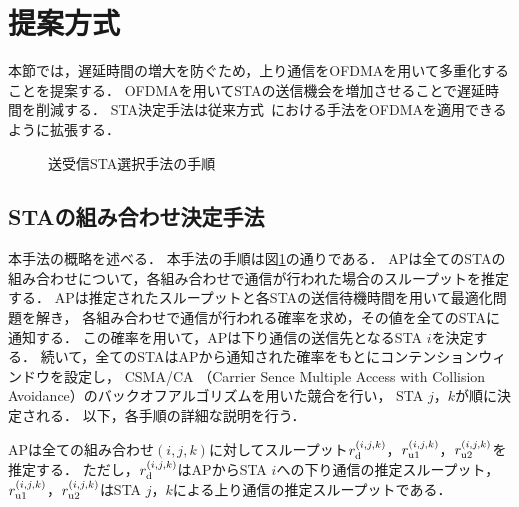 \documentclass[technicalreport]{ieicej}
\newcommand{\sij}{(i,j)}
\newcommand{\sijk}{(i,j,k)}
\newcommand{\rijk}{r^{(i,j,k)}}
\def\coloneqq{\mathrel{\mathop:}=}
\begin{document}
\section{提案方式}\label{sec:propose}
	本節では，遅延時間の増大を防ぐため，上り通信をOFDMAを用いて多重化することを提案する．
	OFDMAを用いてSTAの送信機会を増加させることで遅延時間を削減する．
	STA決定手法は従来方式~\cite{promac_fair}における手法をOFDMAを適用できるように拡張する．

	\begin{figure}[t]
		\centering
		\caption{送受信STA選択手法の手順}
		\label{fig:process}
	\end{figure}

	\subsection{STAの組み合わせ決定手法}\label{sec:opt}
		本手法の概略を述べる．
		本手法の手順は図\ref{fig:process}の通りである．
		APは全てのSTAの組み合わせについて，各組み合わせで通信が行われた場合のスループットを推定する．
		APは推定されたスループットと各STAの送信待機時間を用いて最適化問題を解き，
		各組み合わせで通信が行われる確率を求め，その値を全てのSTAに通知する．
		この確率を用いて，APは下り通信の送信先となるSTA $i$を決定する．
		続いて，全てのSTAはAPから通知された確率をもとにコンテンションウィンドウを設定し，
		CSMA/CA （Carrier Sence Multiple Access with Collision Avoidance）のバックオフアルゴリズムを用いた競合を行い，
		STA $j$，$k$が順に決定される．
		以下，各手順の詳細な説明を行う．
		\par
		APは全ての組み合わせ$(i,j,k)$に対してスループット$r^{(i,j,k)}_{\rm d}$，$r^{(i,j,k)}_{\rm u1}$，$r^{(i,j,k)}_{\rm u2}$を推定する．
		ただし，$r^{(i,j,k)}_{\rm d}$はAPからSTA $i$への下り通信の推定スループット，$r^{(i,j,k)}_{\rm u1}$，$r^{(i,j,k)}_{\rm u2}$はSTA $j$，$k$による上り通信の推定スループットである．
\end{document}
